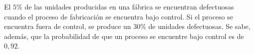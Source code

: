 \addpoints
\question[20] El $5\%$  de las unidades producidas en una fábrica se encuentran defectuosas cuando el proceso de fabricación se encuentra bajo control. Si el proceso se encuentra fuera de control, se produce un $30\%$ de unidades defectuosas. Se sabe, además, que la probabilidad de que un proceso se encuentre bajo control es de $0,92$. 
\noaddpoints
{}

